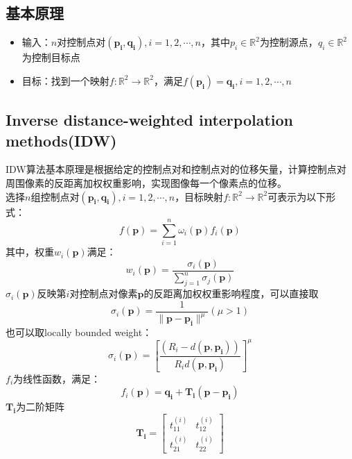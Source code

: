 \documentclass[14pt]{scrartcl} %
\begin{document}
	\subsection{基本原理}
	\begin{itemize}
		\item 输入：$n$对控制点对$(\boldsymbol{p_i},\boldsymbol{q_i}),i=1,2,\cdots,n$，其中$p_i\in \mathbb{R}^2$为控制源点，$q_i\in \mathbb{R}^2$为控制目标点
		\item 目标：找到一个映射$f:\mathbb{R}^2\rightarrow\mathbb{R}^2$，满足$f(\boldsymbol{p_i})=\boldsymbol{q_i},i=1,2,\cdots,n$
	\end{itemize}
	
	\subsection{Inverse distance-weighted interpolation methods(IDW)\cite{ruprecht1995image}}
	IDW算法基本原理是根据给定的控制点对和控制点对的位移矢量，计算控制点对周围像素的反距离加权权重影响，实现图像每一个像素点的位移。\\
	选择$n$组控制点对$(\boldsymbol{p_i},\boldsymbol{q_i}),i=1,2,\cdots,n$，目标映射$f:\mathbb{R}^2\rightarrow \mathbb{R}^2$可表示为以下形式：
	\begin{equation}
		f(\boldsymbol{p})=\sum^n_{i=1}\omega_i(\boldsymbol{p})f_i(\boldsymbol{p})
	\end{equation}
	其中，权重$w_i(\boldsymbol{p})$满足：
	\begin{equation}
		w_i(\boldsymbol{p})=\frac{\sigma_i(\boldsymbol{p})}{\sum\limits^n_{j=1} \sigma_j(\boldsymbol{p})}
	\end{equation}
	$\sigma_i(\boldsymbol{p})$反映第$i$对控制点对像素$\boldsymbol{p}$的反距离加权权重影响程度，可以直接取
	\begin{equation}
		\sigma_i(\boldsymbol{p})=\frac{1}{\|\boldsymbol{p}-\boldsymbol{p_i} \|^\mu} (\mu>1)
	\end{equation}
	也可以取locally bounded weight：
	\begin{equation}
		\sigma_i(\boldsymbol{p})=[\frac{(R_i-d(\boldsymbol{p},\boldsymbol{p_i}))}{R_id(\boldsymbol{p},\boldsymbol{p_i})}]^\mu
	\end{equation}
	$f_i$为线性函数，满足：
	\begin{equation}
		f_i(\boldsymbol{p})=\boldsymbol{q_i}+\boldsymbol{T_i}(\boldsymbol{p}-\boldsymbol{p_i})
	\end{equation}
	$\boldsymbol{T_i}$为二阶矩阵
	\begin{equation}
		\boldsymbol{T_i}=\begin{bmatrix}
			t_{11}^{(i)}&t_{12}^{(i)}\\
			t_{21}^{(i)}&t_{22}^{(i)}
		\end{bmatrix}
	\end{equation}
\end{document}
